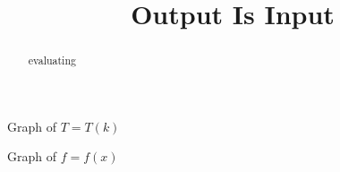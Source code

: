 \documentclass{ximera}
\title{Output Is Input}
\begin{document}
\begin{abstract}
evaluating
\end{abstract}
\maketitle










Graph of $T=T(k)$

\begin{center}
\end{center}






Graph of $f=f(x)$

\begin{center}
\end{center}
\end{document}
